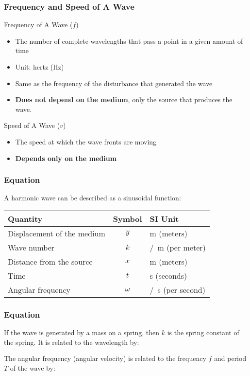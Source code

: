 \documentclass[12pt,aspectratio=169]{beamer}
\newcommand{\eq}[2]{\vspace{#1}{\Large\begin{displaymath}#2\end{displaymath}}}
\begin{document}
\begin{frame}
  \frametitle{Frequency and Speed of A Wave}

  Frequency of A Wave ($f$)
  \begin{itemize}
  \item The number of complete wavelengths that pass a point in a given amount
    of time
  \item Unit: hertz (\si{\hertz})
  \item Same as the frequency of the disturbance that generated the wave
  \item\textbf{Does not depend on the medium}, only the source that produces
    the wave.
  \end{itemize}

  \vspace{.2in}Speed of A Wave ($v$)
  \begin{itemize}
  \item The speed at which the wave fronts are moving
  \item\textbf{Depends only on the medium}
  \end{itemize}
\end{frame}


\begin{frame}
  \frametitle{Equation}
  A harmonic wave can be described as a sinusoidal function:
  \eq{-.1in}{
    \boxed{y(x,t)=A\sin(kx-\omega t)}
  }

  \begin{center}
    \begin{tabular}{l|c|l}
      \rowcolor{pink}
      \textbf{Quantity} & \textbf{Symbol} & \textbf{SI Unit} \\ \hline
      Displacement of the medium  & $y$ & \si{\metre} (meters)\\
      Wave number                 & $k$ & \si{/\metre} (per meter)\\
      Distance from the source    & $x$ & \si{\metre} (meters)\\
      Time                        & $t$ & \si{\second} (seconds)\\
      Angular frequency           & $\omega$ & \si{/\second} (per second)
    \end{tabular}
  \end{center}
\end{frame}


\begin{frame}
  \frametitle{Equation}
  \eq{-.1in}{
    \boxed{y(x,t)=A\sin(kx-\omega t)}
  }

  If the wave is generated by a mass on a spring, then $k$ is the spring
  constant of the spring. It is related to the wavelength by:
  
  \eq{-.2in}{
    k=\frac{2\pi}{\lambda}
  }

  \vspace{-.1in}The angular frequency (angular velocity) is related to the
  frequency $f$ and period $T$ of the wave by:

  \eq{-.35in}{
    \omega=\frac{2\pi}{T}=2\pi f
  }
\end{frame}
\end{document}
